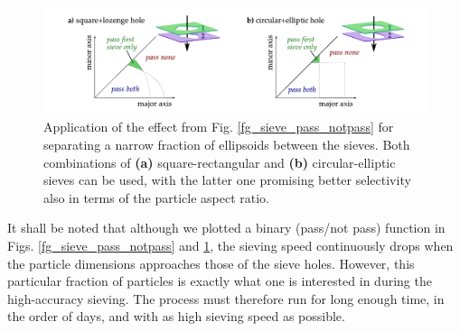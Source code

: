 \begin{figure}[ht] \caption{Application of the effect from Fig. \ref{fg_sieve_pass_notpass} for separating a narrow fraction of ellipsoids between the sieves. Both combinations of \textbf{(a)} square-rectangular and \textbf{(b)} circular-elliptic sieves can be used, with the latter one promising better selectivity also in terms of the particle aspect ratio.} \label{fg_double_sieving} \centering 
\includegraphics[width=\textwidth]{img/technology/sieve_double_sieving_fractions.pdf}
\end{figure}
It shall be noted that although we plotted a binary (pass/not pass) function in Figs. \ref{fg_sieve_pass_notpass} and \ref{fg_double_sieving}, the sieving speed continuously drops when the particle dimensions approaches those of the sieve holes. 
However, this particular fraction of particles is exactly what one is interested in during the high-accuracy sieving. The process must therefore run for long enough time, in the order of days, and with as high sieving speed as possible.
